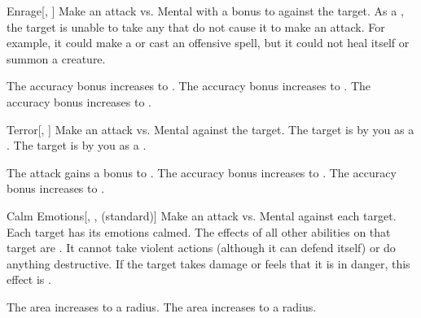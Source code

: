 \lowercase{\hypertarget{spell:Enrage}{}}\label{spell:Enrage}
\begin{freeability}[Rank 1]{\hypertarget{spell:Enrage}{Enrage}}[, ]
Make an attack vs. Mental with a  bonus to  against the target.
\hit As a , the target is unable to take any  that do not cause it to make an attack.
For example, it could make a  or cast an offensive spell, but it could not heal itself or summon a creature.

\rankline
{} The accuracy bonus increases to .
 The accuracy bonus increases to .
 The accuracy bonus increases to .
\end{freeability}
\vspace{0.25em}



\lowercase{\hypertarget{spell:Terror}{}}\label{spell:Terror}
\begin{freeability}[Rank 1]{\hypertarget{spell:Terror}{Terror}}[, ]
Make an attack vs. Mental against the target.
\hit The target is \shaken by you as a .
\crit The target is  by you as a .

\rankline
{} The attack gains a  bonus to .
 The accuracy bonus increases to .
 The accuracy bonus increases to .
\end{freeability}
\vspace{0.25em}



\lowercase{\hypertarget{spell:Calm Emotions}{}}\label{spell:Calm Emotions}
\begin{freeability}[Rank 3]{\hypertarget{spell:Calm Emotions}{Calm Emotions}}[, ,  (standard)]
Make an attack vs. Mental against each target.
\hit Each target has its emotions calmed.
The effects of all other  abilities on that target are .
It cannot take violent actions (although it can defend itself) or do anything destructive.
If the target takes damage or feels that it is in danger, this effect is .

\rankline
{} The area increases to a \areahuge radius.
 The area increases to a \areaext radius.
\end{freeability}
\vspace{0.25em}



